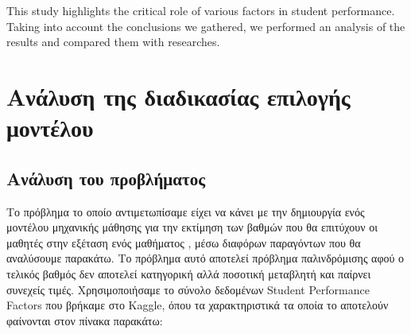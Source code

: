 \documentclass[12pt]{article}
\begin{document}
This study highlights the critical role of various factors in student performance. Taking into account the conclusions we gathered, we performed an analysis of the results and compared them with researches. 
\newpage
\section{Ανάλυση της διαδικασίας επιλογής μοντέλου}
\subsection{Ανάλυση του προβλήματος}

\noindent Το πρόβλημα το οποίο αντιμετωπίσαμε είχει να κάνει με την δημιουργία ενός μοντέλου μηχανικής μάθησης για την εκτίμηση των βαθμών που θα επιτύχουν οι μαθητές στην εξέταση ενός μαθήματος , μέσω διαφόρων παραγόντων που θα αναλύσουμε παρακάτω. Το πρόβλημα αυτό αποτελεί πρόβλημα παλινδρόμισης αφού ο τελικός βαθμός δεν αποτελεί κατηγορική αλλά ποσοτική μεταβλητή και παίρνει συνεχείς τιμές. Χρησιμοποιήσαμε το σύνολο δεδομένων  Student Performance Factors που βρήκαμε στο Kaggle, όπου τα χαρακτηριστικά τα οποία το αποτελούν φαίνονται στον πίνακα παρακάτω:\\
\end{document}
